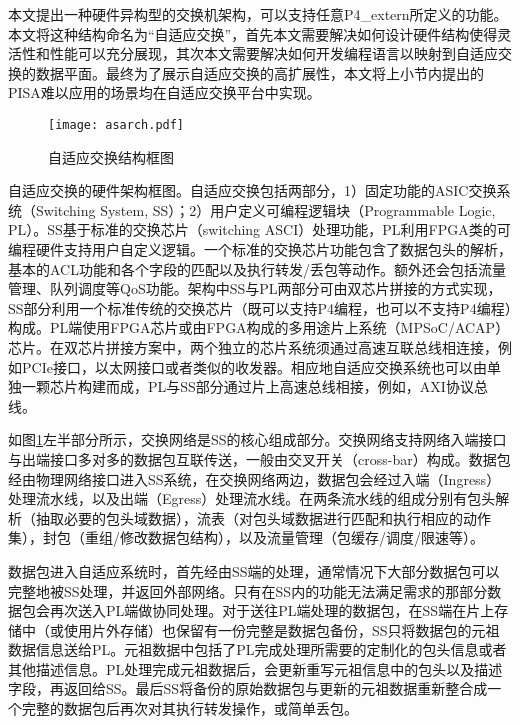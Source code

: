 本文提出一种硬件异构型的交换机架构，可以支持任意P4\_extern所定义的功能。本文将这种结构命名为“自适应交换”，首先本文需要解决如何设计硬件结构使得灵活性和性能可以充分展现，其次本文需要解决如何开发编程语言以映射到自适应交换的数据平面。最终为了展示自适应交换的高扩展性，本文将上小节内提出的PISA难以应用的场景均在自适应交换平台中实现。

\label{chap431}

\begin{figure}[!ht]
	\centering 
	\vspace{-1.5mm} 
	\texttt{[image: asarch.pdf]}
	\caption{自适应交换结构框图} \label{fig:asarch}\vspace{ 1.5mm} 
\end{figure}

自适应交换的硬件架构框图。自适应交换包括两部分，1）固定功能的ASIC交换系统（Switching System, SS）；2）用户定义可编程逻辑块（Programmable Logic, PL）。SS基于标准的交换芯片（switching ASCI）处理功能，PL利用FPGA类的可编程硬件支持用户自定义逻辑。一个标准的交换芯片功能包含了数据包头的解析，基本的ACL功能和各个字段的匹配以及执行转发/丢包等动作。额外还会包括流量管理、队列调度等QoS功能。架构中SS与PL两部分可由双芯片拼接的方式实现，SS部分利用一个标准传统的交换芯片（既可以支持P4编程，也可以不支持P4编程）构成。PL端使用FPGA芯片或由FPGA构成的多用途片上系统（MPSoC/ACAP）芯片。在双芯片拼接方案中，两个独立的芯片系统须通过高速互联总线相连接，例如PCIe接口，以太网接口或者类似的收发器。相应地自适应交换系统也可以由单独一颗芯片构建而成，PL与SS部分通过片上高速总线相接，例如，AXI协议总线。

如图\ref{fig:asarch}左半部分所示，交换网络是SS的核心组成部分。交换网络支持网络入端接口与出端接口多对多的数据包互联传送，一般由交叉开关（cross-bar）构成。数据包经由物理网络接口进入SS系统，在交换网络两边，数据包会经过入端（Ingress）处理流水线，以及出端（Egress）处理流水线。在两条流水线的组成分别有包头解析（抽取必要的包头域数据），流表（对包头域数据进行匹配和执行相应的动作集），封包（重组/修改数据包结构），以及流量管理（包缓存/调度/限速等）。

数据包进入自适应系统时，首先经由SS端的处理，通常情况下大部分数据包可以完整地被SS处理，并返回外部网络。只有在SS内的功能无法满足需求的那部分数据包会再次送入PL端做协同处理。对于送往PL端处理的数据包，在SS端在片上存储中（或使用片外存储）也保留有一份完整是数据包备份，SS只将数据包的元祖数据信息送给PL。元祖数据中包括了PL完成处理所需要的定制化的包头信息或者其他描述信息。PL处理完成元祖数据后，会更新重写元祖信息中的包头以及描述字段，再返回给SS。最后SS将备份的原始数据包与更新的元祖数据重新整合成一个完整的数据包后再次对其执行转发操作，或简单丢包。

